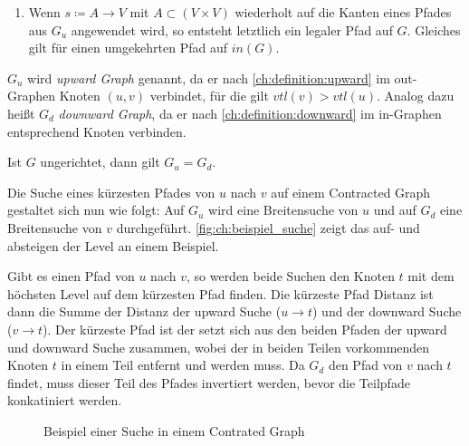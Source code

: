 \begin{definition}
\begin{enumerate}
        \item
              Wenn $s \coloneq A \to V$ mit $A \subset (V \times V)$ wiederholt auf die Kanten eines Pfades aus $G_u$ angewendet wird, so entsteht letztlich ein legaler Pfad auf $G$. Gleiches gilt für einen umgekehrten Pfad auf ${in}(G)$.
    \end{enumerate}


    $G_u$ wird \emph{upward Graph} genannt, da er nach \ref{ch:definition:upward} im out-Graphen Knoten $(u, v)$ verbindet, für die gilt ${vtl}(v) > {vtl}(u)$. Analog dazu heißt $G_d$ \emph{downward Graph}, da er nach \ref{ch:definition:downward} im in-Graphen entsprechend Knoten verbinden.

    Ist $G$ ungerichtet, dann gilt $G_u = G_d$.
\end{definition}


Die Suche eines kürzesten Pfades von $u$ nach $v$ auf einem Contracted Graph gestaltet sich nun wie folgt:
Auf $G_u$ wird eine Breitensuche von $u$ und auf $G_d$ eine Breitensuche von $v$ durchgeführt.
\autoref{fig:ch:beispiel_suche} zeigt das auf- und absteigen der Level an einem Beispiel.

Gibt es einen Pfad von $u$ nach $v$, so werden beide Suchen den Knoten $t$ mit dem höchsten Level auf dem kürzesten Pfad finden.
Die kürzeste Pfad Distanz ist dann die Summe der Distanz der upward Suche ($u \to t$) und der downward Suche ($v \to t$).
Der kürzeste Pfad ist der setzt sich aus den beiden Pfaden der upward und downward Suche zusammen, wobei der in beiden Teilen vorkommenden Knoten $t$ in einem Teil entfernt und werden muss.
Da $G_d$ den Pfad von $v$ nach $t$ findet, muss dieser Teil des Pfades invertiert werden, bevor die Teilpfade konkatiniert werden.

\begin{figure}[ht]
    \centering
    \caption{Beispiel einer Suche in einem Contrated Graph}
    \label{fig:ch:beispiel_suche}
\end{figure}

